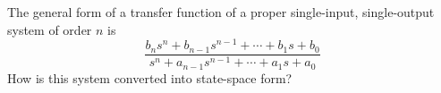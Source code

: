 The general form of a transfer function of a proper single-input,
single-output system of order $n$ is
\[\frac{b_ns^n+b_{n-1}s^{n-1}+\cdots+b_1s + b_0}{s^n+a_{n-1}s^{n-1}+\cdots+a_1s + a_0}\]
How is this system converted into state-space form?
\endinput
